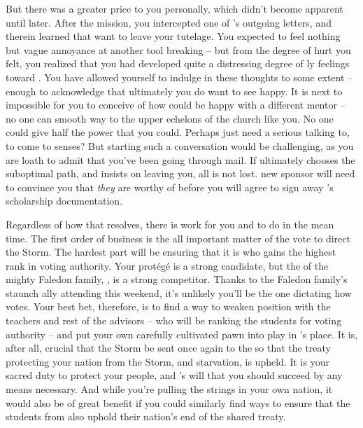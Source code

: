 \documentclass[char]{GL2020}
\begin{document}
But there was a greater price to you personally, which didn't become apparent until later. After the mission, you intercepted one of \cScholarship{}'s outgoing letters, and therein learned that \cScholarship{\they} want\cScholarship{\plural} to leave your tutelage. You expected to feel nothing but vague annoyance at another tool breaking -- but from the degree of hurt you felt, you realized that you had developed quite a distressing degree of \cAntiChup{\parent}ly feelings toward \cScholarship{\them}. You have allowed yourself to indulge in these thoughts to some extent -- enough to acknowledge that ultimately you do want to see \cScholarship{} happy. It is next to impossible for you to conceive of how \cScholarship{\they} could be happy with a different mentor -- no one can smooth \cScholarship{\their} way to the upper echelons of the church like you. No one could give \cScholarship{\them} half the power that you could. Perhaps \cScholarship{\they} just need\cScholarship{\plural} a serious talking to, to come to \cScholarship{\their} senses? But starting such a conversation would be challenging, as you are loath to admit that you've been going through \cScholarship{\their} mail. If ultimately \cScholarship{} chooses the suboptimal path, and insists on leaving you, all is not lost. \cScholarship{\Their} new sponsor will need to convince you that \emph{they} are worthy of \cScholarship{} before you will agree to sign away \cScholarship{}'s scholarship documentation.

Regardless of how that resolves, there is work for you and \cScholarship{} to do in the mean time. The first order of business is the all important matter of the vote to direct the Storm. The hardest part will be ensuring that it is \cScholarship{} who gains the highest rank in voting authority. Your protégé is a strong candidate, but the \cHeir{\child} of the mighty Faledon family, \cHeir{\full}, is a strong competitor. Thanks to the Faledon family's staunch ally \cDiplomat{\full} attending this weekend, it's unlikely you'll be the one dictating how \cHeir{} votes. Your best bet, therefore, is to find a way to weaken \cHeir{\their} position with the \pShip{} teachers and rest of the \pTech{} advisors -- who will be ranking the \pTech{} students for voting authority -- and put your own carefully cultivated pawn into play in \cHeir{}'s place. It is, after all, crucial that the Storm be sent once again to the \pShip{} so that the treaty protecting your nation from the Storm, and starvation, is upheld. It is your sacred duty to protect your people, and \cTechGod{}'s will that you should succeed by any means necessary. And while you're pulling the strings in your own nation, it would also be of great benefit if you could similarly find ways to ensure that the students from \pFarm{} also uphold their nation's end of the shared treaty.
\end{document}
